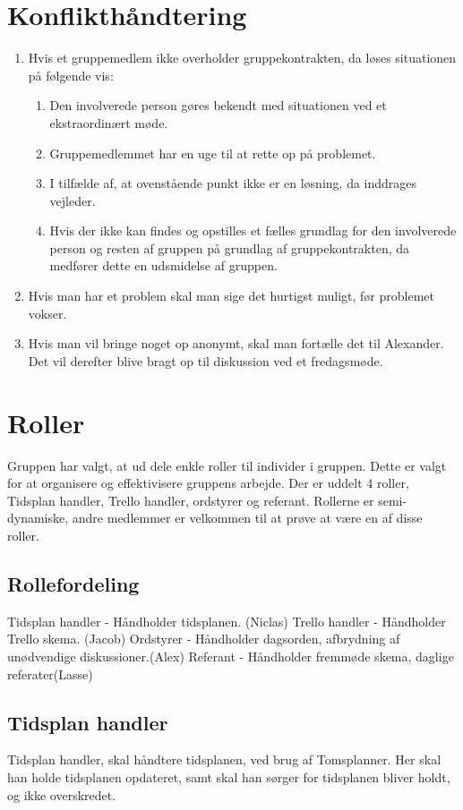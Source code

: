 \section{Konflikthåndtering}
\begin{enumerate}
\item Hvis et gruppemedlem ikke overholder gruppekontrakten, da løses situationen på følgende vis:
\begin{enumerate}
\item Den involverede person gøres bekendt med situationen ved et ekstraordinært møde.
\item Gruppemedlemmet har en uge til at rette op på problemet.
\item I tilfælde af, at ovenstående punkt ikke er en løsning, da inddrages vejleder.
\item Hvis der ikke kan findes og opstilles et fælles grundlag for den involverede person og resten af gruppen på grundlag af gruppekontrakten, da medfører dette en udsmidelse af gruppen.
\end{enumerate}
\item Hvis man har et problem skal man sige det hurtigst muligt, før problemet vokser.
\item Hvis man vil bringe noget op anonymt, skal man fortælle det til Alexander. Det vil derefter blive bragt op til diskussion ved et fredagsmøde.
\end{enumerate}

\section{Roller}
Gruppen har valgt, at ud dele enkle roller til individer i gruppen. Dette er valgt for at organisere og effektivisere gruppens arbejde. Der er uddelt 4 roller, Tidsplan handler, Trello handler, ordstyrer og referant. Rollerne er semi-dynamiske, andre medlemmer er velkommen til at prøve at være en af disse roller.

\subsection{Rollefordeling}
Tidsplan handler - Håndholder tidsplanen. (Niclas)
Trello handler - Håndholder Trello skema. (Jacob)
Ordstyrer - Håndholder dagsorden, afbrydning af unødvendige diskussioner.(Alex)
Referant - Håndholder fremmøde skema, daglige referater(Lasse)

\subsection{Tidsplan handler}
Tidsplan handler, skal håndtere tidsplanen, ved brug af Tomsplanner. Her skal han holde tidsplanen opdateret, samt skal han sørger for tidsplanen bliver holdt, og ikke overskredet.

